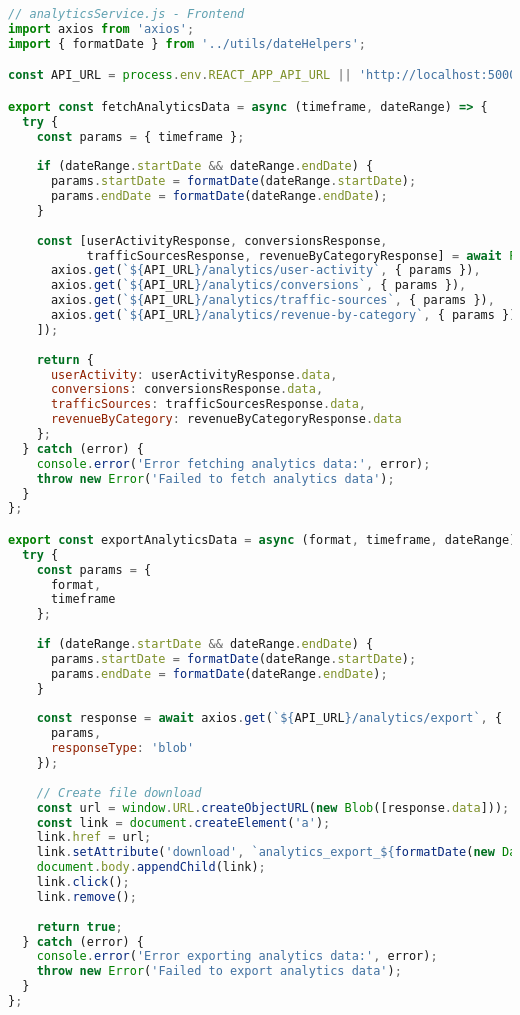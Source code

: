 \documentclass[12pt,a4paper]{article}
\begin{document}
\begin{lstlisting}[language=JavaScript]
// analyticsService.js - Frontend
import axios from 'axios';
import { formatDate } from '../utils/dateHelpers';

const API_URL = process.env.REACT_APP_API_URL || 'http://localhost:5000/api';

export const fetchAnalyticsData = async (timeframe, dateRange) => {
  try {
    const params = { timeframe };
    
    if (dateRange.startDate && dateRange.endDate) {
      params.startDate = formatDate(dateRange.startDate);
      params.endDate = formatDate(dateRange.endDate);
    }
    
    const [userActivityResponse, conversionsResponse, 
           trafficSourcesResponse, revenueByCategoryResponse] = await Promise.all([
      axios.get(`${API_URL}/analytics/user-activity`, { params }),
      axios.get(`${API_URL}/analytics/conversions`, { params }),
      axios.get(`${API_URL}/analytics/traffic-sources`, { params }),
      axios.get(`${API_URL}/analytics/revenue-by-category`, { params })
    ]);
    
    return {
      userActivity: userActivityResponse.data,
      conversions: conversionsResponse.data,
      trafficSources: trafficSourcesResponse.data,
      revenueByCategory: revenueByCategoryResponse.data
    };
  } catch (error) {
    console.error('Error fetching analytics data:', error);
    throw new Error('Failed to fetch analytics data');
  }
};

export const exportAnalyticsData = async (format, timeframe, dateRange) => {
  try {
    const params = { 
      format,
      timeframe 
    };
    
    if (dateRange.startDate && dateRange.endDate) {
      params.startDate = formatDate(dateRange.startDate);
      params.endDate = formatDate(dateRange.endDate);
    }
    
    const response = await axios.get(`${API_URL}/analytics/export`, { 
      params,
      responseType: 'blob'
    });
    
    // Create file download
    const url = window.URL.createObjectURL(new Blob([response.data]));
    const link = document.createElement('a');
    link.href = url;
    link.setAttribute('download', `analytics_export_${formatDate(new Date())}.${format}`);
    document.body.appendChild(link);
    link.click();
    link.remove();
    
    return true;
  } catch (error) {
    console.error('Error exporting analytics data:', error);
    throw new Error('Failed to export analytics data');
  }
};
\end{lstlisting}
\end{document}
